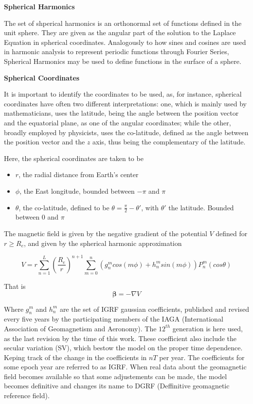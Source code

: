 
{\bf Spherical Harmonics}

The set of shperical harmonics is an orthonormal set of functions defined in the unit sphere. They are given as the angular part of the solution to the Laplace Equation in spherical coordinates. Analogously  to how sines and cosines are used in harmonic analysis to represent periodic functions through Fourier Series, Spherical Harmonics may be used to define functions in the surface of a sphere.

{\bf Spherical Coordinates}

It is important to identify the coordinates to be used, as, for instance, spherical coordinates have often two different interpretations: one, which is mainly used by mathematicians, uses the latitude, being the angle between the position vector and the equatorial plane, as one of the angular coordinates; while the other, broadly employed by physicists, uses the co-latitude, defined as the angle between the position vector and the $z$ axis, thus being the complementary of the latitude. 

Here, the spherical coordinates are taken to be
\begin{itemize} 
\item[] $r$, the radial distance from Earth's center
\item[] $\phi$, the East longitude, bounded between $-\pi$ and $\pi$
\item[] $\theta$, the co-latitude, defined to be $\theta = \frac{\pi}{2} - \theta'$, with $\theta'$ the latitude. Bounded between $0$ and $\pi$
\end{itemize}


The magnetic field is given by the negative gradient of the potential $V$ defined for $r \geq R_e$, and given by the spherical harmonic approximation

\begin{equation} \label{eq:igrf_potential}
V = r \sum_{n=1}^{L} \left(\dfrac{R_e}{r}\right)^{n+1} \sum_{m=0}^{n} \left(g_n^m cos(m\phi) + h_n^m sin(m\phi)\right) P_n^m(cos\theta)
\end{equation}

That is
\begin{equation}
{\bm \beta} = -\nabla V
\end{equation}

Where $g_n^m$ and $h_n^m$ are the set of IGRF gaussian coefficients, published and revised every five years by the participating members of the IAGA (International Association
of Geomagnetism and Aeronomy). The $12^{th}$ generation is here used, as the last revision by the time of this work. These coefficient also include the secular variation (SV), which bestow the model on the proper time dependence. Keping track of the change in the coefficients in $nT$ per year. The coefficients  for some epoch year are referred to as IGRF. When real data about the geomagnetic field becomes available so that some adjustements can be made, the model becomes definitive and changes its name to DGRF (Deffinitive geomagnetic reference field).

